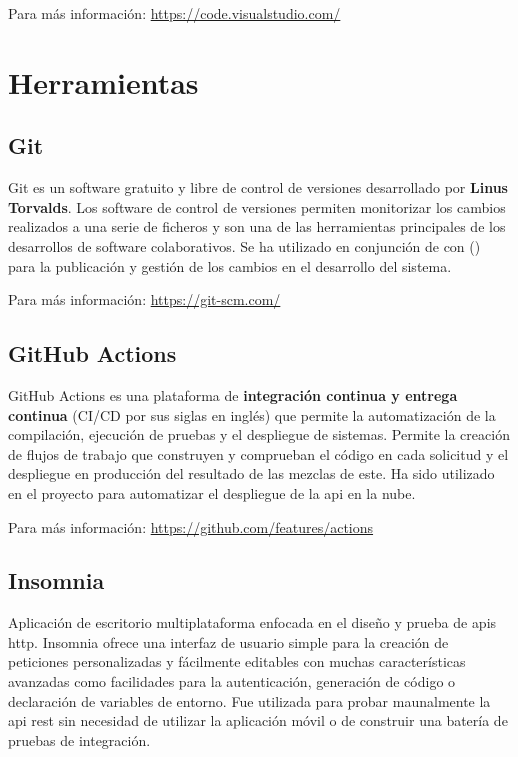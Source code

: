 Para más información: \href{https://code.visualstudio.com/}{https://code.visualstudio.com/}

\section{Herramientas}

\subsection{Git}

Git es un software gratuito y libre de control de versiones desarrollado por \textbf{Linus Torvalds}. Los software de control de versiones permiten monitorizar los cambios realizados a una serie de ficheros y son una de las herramientas principales de los desarrollos de software colaborativos. Se ha utilizado en conjunción de con  () para la publicación y gestión de los cambios en el desarrollo del sistema.

Para más información: \href{https://git-scm.com/}{https://git-scm.com/}

\subsection{GitHub Actions}
\label{tool:github_actions}

GitHub Actions es una plataforma de \textbf{integración continua y entrega continua} (CI/CD por sus siglas en inglés) que permite la automatización de la compilación, ejecución de pruebas y el despliegue de sistemas. Permite la creación de flujos de trabajo que construyen y comprueban el código en cada solicitud y el despliegue en producción del resultado de las mezclas de este. Ha sido utilizado en el proyecto para automatizar el despliegue de la \acrshort{api} en la nube.

Para más información: \href{https://github.com/features/actions}{https://github.com/features/actions}

\subsection{Insomnia}

Aplicación de escritorio multiplataforma enfocada en el diseño y prueba de \acrshort{api}s \acrshort{http}. Insomnia ofrece una interfaz de usuario simple para la creación de peticiones personalizadas y fácilmente editables con muchas características avanzadas como facilidades para la autenticación, generación de código o declaración de variables de entorno. Fue utilizada para probar maunalmente la \acrshort{api} \acrshort{rest} sin necesidad de utilizar la aplicación móvil o de construir una batería de pruebas de integración.

